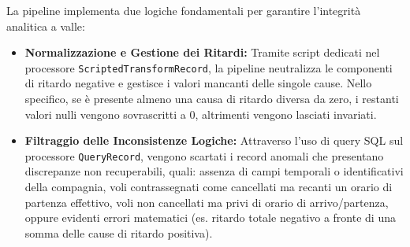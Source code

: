 \documentclass[conference]{IEEEtran}
\begin{document}
La pipeline implementa due logiche fondamentali per garantire l'integrità analitica a valle:
\begin{itemize}
    \item \textbf{Normalizzazione e Gestione dei Ritardi:} Tramite script dedicati nel processore \texttt{ScriptedTransformRecord}, la pipeline neutralizza le componenti di ritardo negative e gestisce i valori mancanti delle singole cause.
    Nello specifico, se è presente almeno una causa di ritardo diversa da zero, i restanti valori nulli vengono sovrascritti a 0, altrimenti vengono lasciati invariati.
    \item \textbf{Filtraggio delle Inconsistenze Logiche:} Attraverso l'uso di query SQL sul processore \texttt{QueryRecord}, vengono scartati i record anomali che presentano discrepanze non recuperabili, quali: assenza di campi temporali o identificativi della compagnia, voli contrassegnati come cancellati ma recanti un orario di partenza effettivo, voli non cancellati ma privi di orario di arrivo/partenza, oppure evidenti errori matematici (es. ritardo totale negativo a fronte di una somma delle cause di ritardo positiva).
\end{itemize}

%
%
%
%
%
%
\end{document}
